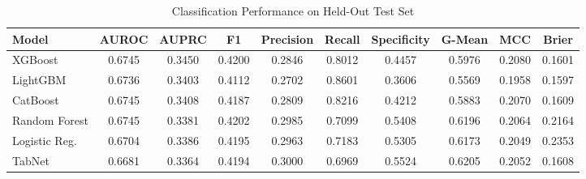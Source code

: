 \begin{table}
\centering
\caption{Classification Performance on Held-Out Test Set}
\label{tab:results}
\begin{tabular}{lccccccccc}
\toprule
Model & AUROC & AUPRC & F1 & Precision & Recall & Specificity & G-Mean & MCC & Brier \\
\midrule
XGBoost & 0.6745 & 0.3450 & 0.4200 & 0.2846 & 0.8012 & 0.4457 & 0.5976 & 0.2080 & 0.1601 \\
LightGBM & 0.6736 & 0.3403 & 0.4112 & 0.2702 & 0.8601 & 0.3606 & 0.5569 & 0.1958 & 0.1597 \\
CatBoost & 0.6745 & 0.3408 & 0.4187 & 0.2809 & 0.8216 & 0.4212 & 0.5883 & 0.2070 & 0.1609 \\
Random Forest & 0.6745 & 0.3381 & 0.4202 & 0.2985 & 0.7099 & 0.5408 & 0.6196 & 0.2064 & 0.2164 \\
Logistic Reg. & 0.6704 & 0.3386 & 0.4195 & 0.2963 & 0.7183 & 0.5305 & 0.6173 & 0.2049 & 0.2353 \\
TabNet & 0.6681 & 0.3364 & 0.4194 & 0.3000 & 0.6969 & 0.5524 & 0.6205 & 0.2052 & 0.1608 \\
\bottomrule
\end{tabular}
\end{table}
